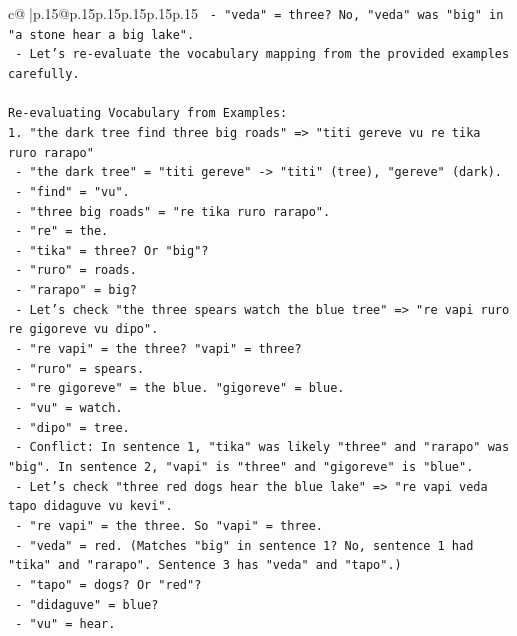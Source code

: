 \documentclass{article}
\begin{document}
{\begin{supertabular}{c@{$\;$}|p{.15\linewidth}@{}p{.15\linewidth}p{.15\linewidth}p{.15\linewidth}p{.15\linewidth}p{.15\linewidth}}
{{{\texttt{        {-} "veda" = three? No, "veda" was "big" in "a stone hear a big lake".} \\
\texttt{        {-} Let's re{-}evaluate the vocabulary mapping from the provided examples carefully.} \\
\\ 
\texttt{Re{-}evaluating Vocabulary from Examples:} \\
\texttt{1. "the dark tree find three big roads" => "titi gereve vu re tika ruro rarapo"} \\
\texttt{   {-} "the dark tree" = "titi gereve" {-}> "titi" (tree), "gereve" (dark).} \\
\texttt{   {-} "find" = "vu".} \\
\texttt{   {-} "three big roads" = "re tika ruro rarapo".} \\
\texttt{     {-} "re" = the.} \\
\texttt{     {-} "tika" = three? Or "big"?} \\
\texttt{     {-} "ruro" = roads.} \\
\texttt{     {-} "rarapo" = big?} \\
\texttt{   {-} Let's check "the three spears watch the blue tree" => "re vapi ruro re gigoreve vu dipo".} \\
\texttt{     {-} "re vapi" = the three? "vapi" = three?} \\
\texttt{     {-} "ruro" = spears.} \\
\texttt{     {-} "re gigoreve" = the blue. "gigoreve" = blue.} \\
\texttt{     {-} "vu" = watch.} \\
\texttt{     {-} "dipo" = tree.} \\
\texttt{   {-} Conflict: In sentence 1, "tika" was likely "three" and "rarapo" was "big". In sentence 2, "vapi" is "three" and "gigoreve" is "blue".} \\
\texttt{   {-} Let's check "three red dogs hear the blue lake" => "re vapi veda tapo didaguve vu kevi".} \\
\texttt{     {-} "re vapi" = the three. So "vapi" = three.} \\
\texttt{     {-} "veda" = red. (Matches "big" in sentence 1? No, sentence 1 had "tika" and "rarapo". Sentence 3 has "veda" and "tapo".)} \\
\texttt{     {-} "tapo" = dogs? Or "red"?} \\
\texttt{     {-} "didaguve" = blue?} \\
\texttt{     {-} "vu" = hear.} \\
}}}
\end{supertabular}}
\end{document}
